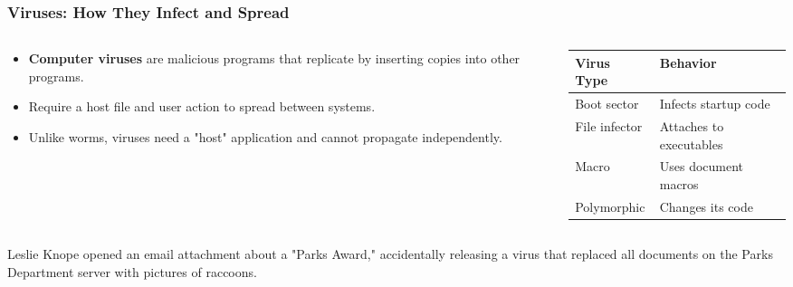 \documentclass{beamer}
\begin{document}
\begin{frame}
    \frametitle{Viruses: How They Infect and Spread}
    
    \begin{columns}
        \begin{column}{0.5\textwidth}
            \begin{itemize}
                \item \textbf{Computer viruses} are malicious programs that replicate by inserting copies into other programs.
                \item Require a host file and user action to spread between systems.
                \item Unlike worms, viruses need a "host" application and cannot propagate independently.
            \end{itemize}
        \end{column}
        \begin{column}{0.5\textwidth}
            \begin{table}
                \centering
                \small
                \begin{tabular}{l|l}
                    \textbf{Virus Type} & \textbf{Behavior} \\
                    \hline
                    Boot sector & Infects startup code \\
                    File infector & Attaches to executables \\
                    Macro & Uses document macros \\
                    Polymorphic & Changes its code \\
                \end{tabular}
            \end{table}
        \end{column}
    \end{columns}
    
    \begin{example}
        Leslie Knope opened an email attachment about a "Parks Award," accidentally releasing a virus that replaced all documents on the Parks Department server with pictures of raccoons.
    \end{example}
\end{frame}
\end{document}
